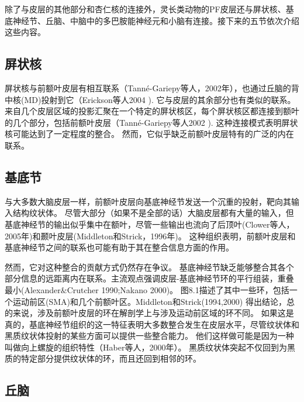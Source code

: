 除了与皮层的其他部分和杏仁核的连接外，灵长类动物的PF皮层还与屏状核、基底神经节、丘脑、中脑中的多巴胺能神经元和小脑有连接。接下来的五节依次介绍这些内容。



\subsection{屏状核}
\par

屏状核与前额叶皮层有相互联系（Tanné-Gariepy等人，2002年），也通过丘脑的背中核(MD)投射到它（Erickson等人2004 ). 它与皮层的其余部分也有类似的联系。来自几个皮层区域的投影汇聚在一个特定的屏状核区，每个屏状核区都连接到额叶的几个部分，包括前额叶皮层（Tanné-Gariepy等人2002 ). 这种连接模式表明屏状核可能达到了一定程度的整合。
然而，它似乎缺乏前额叶皮层特有的广泛的内在联系。



\subsection{基底节}
\par

与大多数大脑皮层一样，前额叶皮层向基底神经节发送一个沉重的投射，靶向其输入结构纹状体。
尽管大部分（如果不是全部的话）大脑皮层都有大量的输入，但基底神经节的输出似乎集中在额叶，尽管一些输出也流向了后顶叶(Clower等人，2005年)和颞叶皮层(Middleton和Strick，1996年)。
这种组织表明，前额叶皮层和基底神经节之间的联系也可能有助于其在整合信息方面的作用。
\par

然而，它对这种整合的贡献方式仍然存在争议。
基底神经节缺乏能够整合其各个部分信息的远距离内在联系。主流观点强调皮层-基底神经节环的平行组装，重叠最小(Alexander$\&$Crutcher 1990;Nakano 2000)。
图8.1描述了其中一些环，包括一个运动前区(SMA)和几个前额叶区。Middleton和Strick(1994,2000) 得出结论，总的来说，涉及前额叶皮层的环在解剖学上与涉及运动前区域的环不同。
如果这是真的，基底神经节组织的这一特征表明大多数整合发生在皮层水平，尽管纹状体和黑质纹状体投射的某些方面可以提供一些整合能力。
他们这样做可能是因为一种叫做向上螺旋的组织特性（Haber等人，2000年）。
黑质纹状体突起不仅回到为黑质的特定部分提供纹状体的环，而且还回到相邻的环。



\subsection{丘脑}
\par

